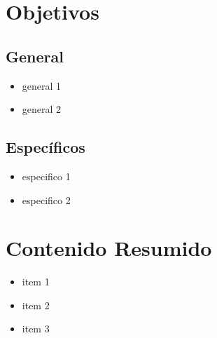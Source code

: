 \documentclass[11pt]{article}
\begin{document}
\section*{Objetivos}

\subsection*{General}

\begin{itemize}
\item general 1 \item general 2 
\end{itemize}

\subsection*{Específicos}

\begin{itemize}
\item especifico 1 \item especifico 2 
\end{itemize}

\section*{Contenido Resumido}

\begin{itemize}
\item item 1 \item item 2 \item item 3 
\end{itemize}

\end{document}
